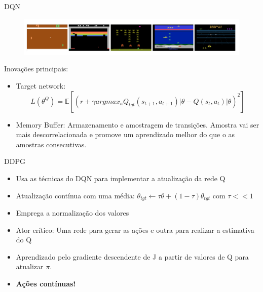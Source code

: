 \documentclass[pdf]{beamer}
\begin{document}
\begin{frame}{DQN}
\begin{subfigure}[t]{\textwidth}
	\centering
	\includegraphics[scale=0.5]{img/atari.png}
\end{subfigure}
Inovações principais:
\begin{itemize}
	\item Target network: 
	$$ 	L(\theta^Q) = \mathbb{E} [(r + \gamma argmax_aQ_{tgt}(s_{t+1}, a_{t+1})|\theta -  Q(s_{t}, a_{t})|\theta )^2]  $$
	\item Memory Buffer: Armazenamento e amostragem de transições. Amostra vai ser mais descorrelacionada e promove um aprendizado melhor do que o as amostras consecutivas.
\end{itemize}

\end{frame}


\begin{frame}{DDPG}
	\begin{itemize}
		\item Usa as técnicas do DQN para implementar a atualização da rede Q
		\item Atualização contínua com uma média: $ \theta_{tgt} \leftarrow \tau\theta + (1 - \tau)\theta_{tgt}$ com $\tau << 1$
		\item Emprega a normalização dos valores
		\item  Ator crítico: Uma rede para gerar as ações e outra para realizar a estimativa do Q
		\item Aprendizado pelo gradiente descendente de J a partir de valores de Q para atualizar $\pi$. 

		\item \textbf{Ações contínuas!}

	\end{itemize}
\end{frame}
\end{document}
